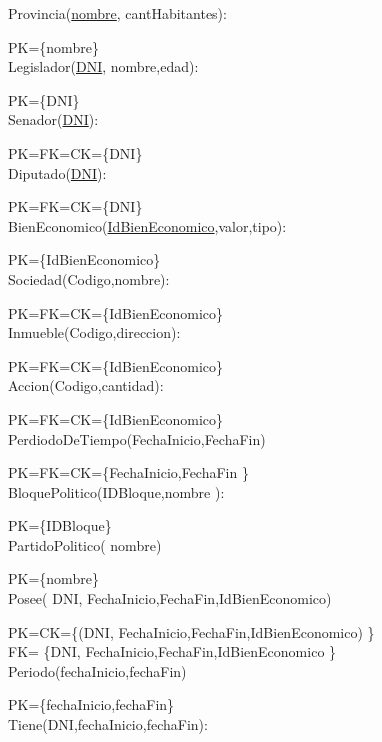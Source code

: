 Provincia(\underline{nombre}, cantHabitantes):

PK={\{nombre}\}\\

Legislador(\underline{DNI}, nombre,edad):

PK={\{DNI}\}\\

Senador(\underline{DNI}):

PK=FK=CK={\{DNI}\}\\

Diputado(\underline{DNI}):

PK=FK=CK={\{DNI}\}\\

BienEconomico(\underline{IdBienEconomico},valor,tipo):

PK={\{IdBienEconomico}\}\\

Sociedad(Codigo,nombre):

PK=FK=CK={\{IdBienEconomico}\}\\

Inmueble(Codigo,direccion):

PK=FK=CK={\{IdBienEconomico}\}\\

Accion(Codigo,cantidad):

PK=FK=CK={\{IdBienEconomico}\}\\

PerdiodoDeTiempo(FechaInicio,FechaFin)

PK=FK=CK={\{FechaInicio,FechaFin }\}\\

BloquePolitico(IDBloque,nombre ):

PK={\{IDBloque}\}\\

PartidoPolitico( nombre)

PK={\{nombre}\}\\

Posee( DNI, FechaInicio,FechaFin,IdBienEconomico)

PK=CK={\{(DNI, FechaInicio,FechaFin,IdBienEconomico) }\}\\

FK= {\{DNI, FechaInicio,FechaFin,IdBienEconomico }\}\\

Periodo(fechaInicio,fechaFin)

PK={\{fechaInicio,fechaFin}\}\\

Tiene(DNI,fechaInicio,fechaFin):

